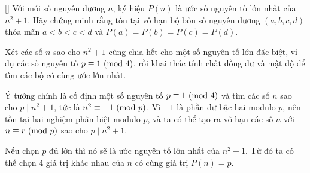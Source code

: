 \documentclass[../02-modular-arithmetic-b.tex]{subfiles}
\begin{document}
\begin{exercise*}\label{example:HUN-2015-TST-KMA-643}[\textbf{}]
    Với mỗi số nguyên dương \( n \), ký hiệu \( P(n) \) là ước số nguyên tố lớn nhất của \( n^2 + 1 \).
    Hãy chứng minh rằng tồn tại vô hạn bộ bốn số nguyên dương \( (a, b, c, d) \) thỏa mãn \( a < b < c < d \) và \( P(a) = P(b) = P(c) = P(d) \).
\end{exercise*}

\begin{remark*}
    Xét các số \( n \) sao cho \( n^2 + 1 \) cùng chia hết cho một số nguyên tố lớn đặc biệt, ví dụ các số nguyên tố \( p \equiv 1 \ (\mathrm{mod}\ 4) \),
    rồi khai thác tính chất đồng dư và mật độ để tìm các bộ có cùng ước lớn nhất.
\end{remark*}

\begin{story*}
    Ý tưởng chính là cố định một số nguyên tố \( p \equiv 1 \ (\mathrm{mod}\ 4) \) và tìm các số \( n \) sao cho \( p \mid n^2 + 1 \),
    tức là \( n^2 \equiv -1 \ (\mathrm{mod}\ p) \). Vì \( -1 \) là phần dư bậc hai modulo \( p \), nên tồn tại hai nghiệm phân biệt modulo \( p \),
    và ta có thể tạo ra vô hạn các số \( n \) với \( n \equiv r \ (\mathrm{mod}\ p) \) sao cho \( p \mid n^2 + 1 \).
    
    Nếu chọn \( p \) đủ lớn thì nó sẽ là ước nguyên tố lớn nhất của \( n^2 + 1 \).
    Từ đó ta có thể chọn 4 giá trị khác nhau của \( n \) có cùng giá trị \( P(n) = p \).
\end{story*}
\end{document}
